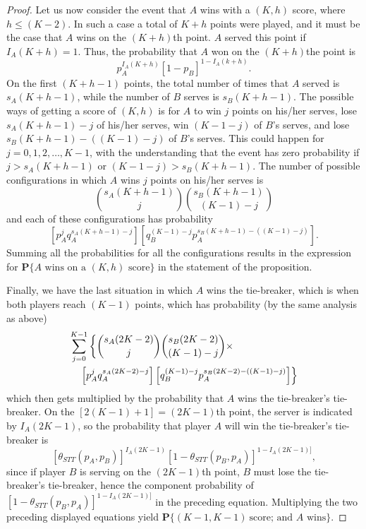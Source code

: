 \documentclass[10pt,a4paper]{amsart}
\renewcommand{\Pr}{\mathbf{P}}
\begin{document}
\begin{proof}
{    Let us now consider the event that $A$ wins with a $(K,h)$ score, where $h \le (K-2)$. In such a case a total of $K+h$ points were played, and it must be the case that $A$ wins on the $(K+h)$th point. $A$ served this point if $I_A(K+h) = 1$. Thus, the probability that $A$ won on the $(K+h)$the point is 
    $$p_A^{I_A(K+h)} [1 - p_B]^{1 - I_A(k+h)}.$$
    On the first $(K+h-1)$ points, the total number of times that $A$ served is $s_A(K+h-1)$, while the number of $B$ serves is $s_B(K+h-1)$. The possible ways of getting a score of $(K,h)$ is for $A$ to win $j$ points on his/her serves, lose $s_A(K+h-1) - j$ of his/her serves, win $(K-1-j)$ of $B$'s serves, and lose $s_B(K+h-1) - ((K-1)-j)$ of $B$'s serves. This could happen for $j=0,1,2,\ldots,K-1$, with the understanding that the event has zero probability if $j > s_A(K+h-1)$ or $(K-1-j) > s_B(K+h-1)$. The number of possible configurations in which $A$ wins $j$ points on his/her serves is
    $${s_A(K+h-1) \choose j} {s_B(K+h-1) \choose {(K-1) - j}}$$
    and each of these configurations has probability
    $$\left[p_A^j q_A^{s_A(K+h-1) - j}\right]
        \left[q_B^{(K-1)-j} p_A^{s_B(K+h-1) - ((K-1)-j)}\right].$$
Summing all the probabilities for all the configurations results in the expression for $\Pr\{\mbox{$A$ wins on a $(K,h)$ score}\}$ in the statement of the proposition.

Finally, we have the last situation in which $A$ wins the tie-breaker, which is when both players reach $(K-1)$ points, which has probability (by the same analysis as above)
%
\begin{eqnarray*}
   \lefteqn{ \sum_{j=0}^{K-1} \left\{ {s_A(2K-2) \choose j} {s_B(2K-2) \choose {(K-1) - j}} \times \right. } \\ && \left.
        \left[p_A^j q_A^{s_A(2K-2) - j}\right]
        \left[q_B^{(K-1)-j} p_A^{s_B(2K-2) - ((K-1)-j)}\right]
        \right\}
\end{eqnarray*}
%
which then gets multiplied by the probability that $A$ wins the tie-breaker's tie-breaker. On the $[2(K-1)+1] = (2K -1)$th point, the server is indicated by $I_A(2K-1)$, so the probability that player $A$ will win the tie-breaker's tie-breaker is
%
$$[\theta_{STT}(p_A,p_B)]^{I_A(2K-1)} [1 - \theta_{STT}(p_B,p_A)]^{1 - I_A(2K-1)]},$$
%
since if player $B$ is serving on the $(2K-1)$th point, $B$ must lose the tie-breaker's tie-breaker, hence the component probability of $[1 - \theta_{STT}(p_B,p_A)]^{1 - I_A(2K-1)]}$ in the preceding equation.
%
Multiplying the two preceding displayed equations yield $\Pr\{(K-1,K-1)\ \mbox{score; and $A$ wins}\}$.

}
\end{proof}
\end{document}
